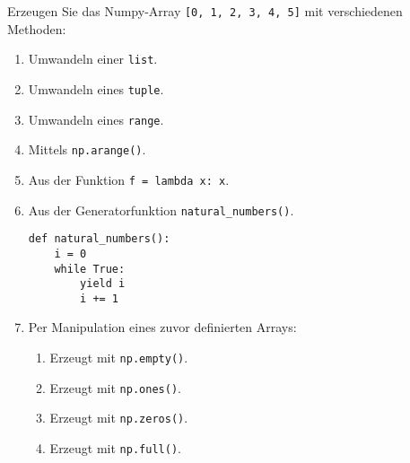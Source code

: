 Erzeugen Sie das Numpy-Array \lstinline![0, 1, 2, 3, 4, 5]! mit verschiedenen
Methoden:

\begin{enumerate}
	\item Umwandeln einer \lstinline!list!.
	\item Umwandeln eines \lstinline!tuple!.
	\item Umwandeln eines \lstinline!range!.
	\item Mittels \lstinline!np.arange()!.
	\item Aus der Funktion \lstinline!f = lambda x: x!.
	\item Aus der Generatorfunktion \lstinline!natural_numbers()!.
	\begin{lstlisting}
def natural_numbers():
    i = 0
    while True:
        yield i
        i += 1
	\end{lstlisting}
	\item Per Manipulation eines zuvor definierten Arrays:
	\begin{enumerate}
		\item Erzeugt mit \lstinline!np.empty()!.
		\item Erzeugt mit \lstinline!np.ones()!.
		\item Erzeugt mit \lstinline!np.zeros()!.
		\item Erzeugt mit \lstinline!np.full()!.
	\end{enumerate}
\end{enumerate}
